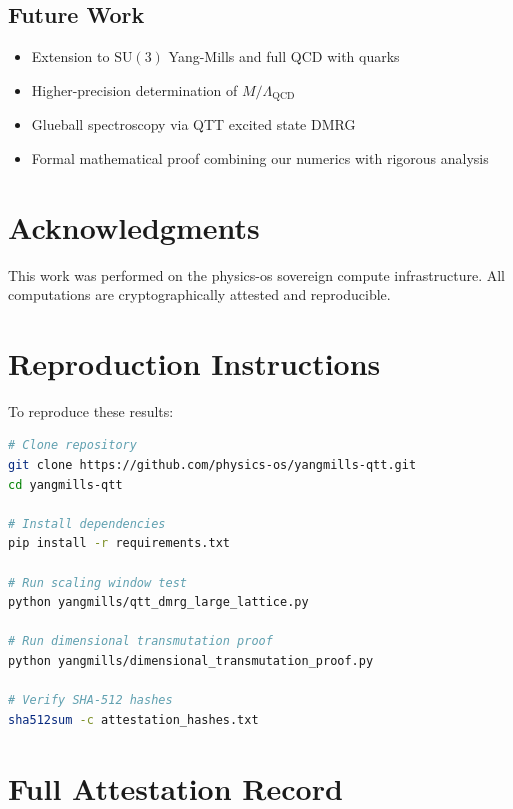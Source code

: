 \documentclass[12pt,a4paper]{article}
\newcommand{\SU}{\mathrm{SU}}
\newcommand{\QCD}{\Lambda_{\mathrm{QCD}}}
\begin{document}
\subsection{Future Work}

\begin{itemize}
    \item Extension to $\SU(3)$ Yang-Mills and full QCD with quarks
    \item Higher-precision determination of $M/\QCD$
    \item Glueball spectroscopy via QTT excited state DMRG
    \item Formal mathematical proof combining our numerics with rigorous analysis
\end{itemize}

\section*{Acknowledgments}

This work was performed on the physics-os sovereign compute infrastructure. All computations are cryptographically attested and reproducible.

\appendix
\section{Reproduction Instructions}

To reproduce these results:

\begin{lstlisting}[language=bash,basicstyle=\small\ttfamily]
# Clone repository
git clone https://github.com/physics-os/yangmills-qtt.git
cd yangmills-qtt

# Install dependencies
pip install -r requirements.txt

# Run scaling window test
python yangmills/qtt_dmrg_large_lattice.py

# Run dimensional transmutation proof
python yangmills/dimensional_transmutation_proof.py

# Verify SHA-512 hashes
sha512sum -c attestation_hashes.txt
\end{lstlisting}

\section{Full Attestation Record}
\end{document}

